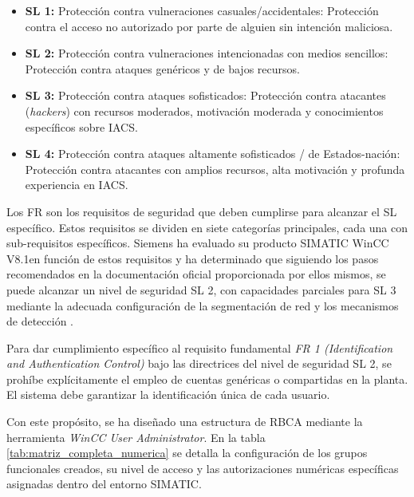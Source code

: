 \begin{itemize}
    \item \textbf{\ac{SL} 1:} Protección contra vulneraciones casuales/accidentales:
    Protección contra el acceso no autorizado por parte de alguien sin intención maliciosa.
    \item \textbf{\ac{SL} 2:} Protección contra vulneraciones intencionadas con medios sencillos:
    Protección contra ataques genéricos y de bajos recursos.
    \item \textbf{\ac{SL} 3:} Protección contra ataques sofisticados:
    Protección contra atacantes (\textit{hackers}) con recursos moderados, motivación moderada y conocimientos específicos sobre \ac{IACS}.
    \item \textbf{\ac{SL} 4:} Protección contra ataques altamente sofisticados / de Estados-nación:
    Protección contra atacantes con amplios recursos, alta motivación y profunda experiencia en \ac{IACS}.
\end{itemize}

Los \ac{FR} son los requisitos de seguridad que deben cumplirse para alcanzar el \ac{SL} específico. Estos requisitos se dividen en siete categorías principales, cada una con sub-requisitos específicos. Siemens ha evaluado su producto SIMATIC WinCC V8.1en función de estos requisitos y ha determinado que siguiendo los pasos recomendados en la documentación oficial proporcionada por ellos mismos, se puede alcanzar un nivel de seguridad \ac{SL} 2, con capacidades parciales para \ac{SL} 3 mediante la adecuada configuración de la segmentación de red y los mecanismos de detección \cite{siemens_wincc_security}.

Para dar cumplimiento específico al requisito fundamental \textit{\ac{FR} 1 (Identification and Authentication Control)} bajo las directrices del nivel de seguridad \ac{SL} 2, se prohíbe explícitamente el empleo de cuentas genéricas o compartidas en la planta. El sistema debe garantizar la identificación única de cada usuario. 

Con este propósito, se ha diseñado una estructura de \ac{RBCA} mediante la herramienta \textit{WinCC User Administrator}. En la tabla \ref{tab:matriz_completa_numerica} se detalla la configuración de los grupos funcionales creados, su nivel de acceso y las autorizaciones numéricas específicas asignadas dentro del entorno SIMATIC.

